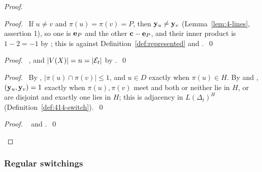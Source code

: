 \begin{proof}
 \begin{proof}\pf\ If $u\ne v$ and $\pi(u)=\pi(v)=P$, then ${\mathbf y}_u\ne{\mathbf y}_v$
  (Lemma~\ref{lem:4-lines}, assertion 1), so one is ${\mathbf e}_P$ and the other ${\mathbf c}-{\mathbf e}_P$, and their
  inner product is $1-2=-1$ by ; this is against
  Definition~\ref{def:represented} and .~\qed\end{proof}
 \begin{proof}\pf\ , and $|V(X)|=n=|\mathcal E_t|$ by .~\qed\end{proof}
 \begin{proof}\pf\ By , $|\pi(u)\cap\pi(v)|\le1$, and $u\in D$ exactly when
  $\pi(u)\in H$. By  and , $({\mathbf y}_u,{\mathbf y}_v)=1$ exactly when
  $\pi(u),\pi(v)$ meet and both or neither lie in $H$, or are disjoint and exactly one lies in
  $H$; this is adjacency in $L(\Delta_t)^H$ (Definition~\ref{def:414-switch}).~\qed\end{proof}
 \qedstep
 \begin{proof}\pf\  and .~\qed\end{proof}
\end{proof}

\subsubsection*{Regular switchings}

